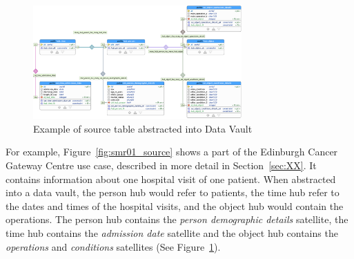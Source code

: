 \begin{figure}
    \centering
    \includegraphics[width=80mm]{images/DataVault/DataVault.pdf}
    \caption{Example of source table abstracted into Data Vault}
    \label{fig:dv_smr01}
\end{figure}

For example, Figure~\ref{fig:smr01_source} shows a part of the Edinburgh Cancer Gateway Centre use case, described in more detail in Section~\ref{sec:XX}. It contains information about one hospital visit of one patient. When abstracted into a data vault, the person hub would refer to patients, the time hub refer to the dates and times of the hospital visits, and the object hub would contain the operations. The person hub contains the \emph{person demographic details} satellite, the time hub contains the \emph{admission date} satellite and the object hub contains the \emph{operations} and \emph{conditions} satellites (See Figure~\ref{fig:dv_smr01}). 






